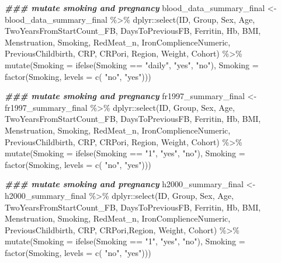\documentclass[
]{article}
\newenvironment{Shaded}{\begin{snugshade}}{\end{snugshade}}
\newcommand{\AttributeTok}[1]{\textcolor[rgb]{0.77,0.63,0.00}{#1}}
\newcommand{\DocumentationTok}[1]{\textcolor[rgb]{0.56,0.35,0.01}{\textbf{\textit{#1}}}}
\newcommand{\FunctionTok}[1]{\textcolor[rgb]{0.00,0.00,0.00}{#1}}
\newcommand{\NormalTok}[1]{#1}
\newcommand{\OtherTok}[1]{\textcolor[rgb]{0.56,0.35,0.01}{#1}}
\newcommand{\SpecialCharTok}[1]{\textcolor[rgb]{0.00,0.00,0.00}{#1}}
\newcommand{\StringTok}[1]{\textcolor[rgb]{0.31,0.60,0.02}{#1}}
\begin{document}
\begin{Shaded}
\begin{Highlighting}[]
\DocumentationTok{\#\#\# mutate smoking and pregnancy }
\NormalTok{blood\_data\_summary\_final }\OtherTok{\textless{}{-}}\NormalTok{ blood\_data\_summary\_final }\SpecialCharTok{\%\textgreater{}\%} 
\NormalTok{  dplyr}\SpecialCharTok{::}\FunctionTok{select}\NormalTok{(ID, Group, Sex, Age, TwoYearsFromStartCount\_FB, DaysToPreviousFB,}
\NormalTok{                Ferritin, Hb, BMI, Menstruation, Smoking, RedMeat\_n, IronComplienceNumeric, PreviousChildbirth,}
\NormalTok{                CRP, CRPori, Region, Weight, Cohort) }\SpecialCharTok{\%\textgreater{}\%} 
    \FunctionTok{mutate}\NormalTok{(}\AttributeTok{Smoking =} \FunctionTok{ifelse}\NormalTok{(Smoking }\SpecialCharTok{==} \StringTok{"daily"}\NormalTok{, }\StringTok{"yes"}\NormalTok{, }\StringTok{"no"}\NormalTok{),}
         \AttributeTok{Smoking =} \FunctionTok{factor}\NormalTok{(Smoking, }\AttributeTok{levels =} \FunctionTok{c}\NormalTok{( }\StringTok{"no"}\NormalTok{,  }\StringTok{"yes"}\NormalTok{)))}

\DocumentationTok{\#\#\# mutate smoking and pregnancy }
\NormalTok{fr1997\_summary\_final }\OtherTok{\textless{}{-}}\NormalTok{ fr1997\_summary\_final }\SpecialCharTok{\%\textgreater{}\%} 
\NormalTok{  dplyr}\SpecialCharTok{::}\FunctionTok{select}\NormalTok{(ID, Group, Sex, Age, TwoYearsFromStartCount\_FB, DaysToPreviousFB,}
\NormalTok{                Ferritin, Hb, BMI, Menstruation, Smoking, RedMeat\_n, IronComplienceNumeric, PreviousChildbirth,}
\NormalTok{                CRP, CRPori, Region, Weight, Cohort) }\SpecialCharTok{\%\textgreater{}\%} 
       \FunctionTok{mutate}\NormalTok{(}\AttributeTok{Smoking =} \FunctionTok{ifelse}\NormalTok{(Smoking }\SpecialCharTok{==} \StringTok{"1"}\NormalTok{, }\StringTok{"yes"}\NormalTok{, }\StringTok{"no"}\NormalTok{),}
       \AttributeTok{Smoking =} \FunctionTok{factor}\NormalTok{(Smoking, }\AttributeTok{levels =} \FunctionTok{c}\NormalTok{( }\StringTok{"no"}\NormalTok{,  }\StringTok{"yes"}\NormalTok{)))}

\DocumentationTok{\#\#\# mutate smoking and pregnancy}
\NormalTok{h2000\_summary\_final }\OtherTok{\textless{}{-}}\NormalTok{ h2000\_summary\_final }\SpecialCharTok{\%\textgreater{}\%} 
\NormalTok{  dplyr}\SpecialCharTok{::}\FunctionTok{select}\NormalTok{(ID, Group, Sex, Age, TwoYearsFromStartCount\_FB, DaysToPreviousFB,}
\NormalTok{                Ferritin, Hb, BMI, Menstruation, Smoking, RedMeat\_n, IronComplienceNumeric, PreviousChildbirth,}
\NormalTok{                CRP, CRPori,Region, Weight, Cohort) }\SpecialCharTok{\%\textgreater{}\%} 
         \FunctionTok{mutate}\NormalTok{(}\AttributeTok{Smoking =} \FunctionTok{ifelse}\NormalTok{(Smoking }\SpecialCharTok{==} \StringTok{"1"}\NormalTok{, }\StringTok{"yes"}\NormalTok{, }\StringTok{"no"}\NormalTok{),}
         \AttributeTok{Smoking =} \FunctionTok{factor}\NormalTok{(Smoking, }\AttributeTok{levels =} \FunctionTok{c}\NormalTok{( }\StringTok{"no"}\NormalTok{,  }\StringTok{"yes"}\NormalTok{)))}
         


\end{Highlighting}
\end{Shaded}
\end{document}
